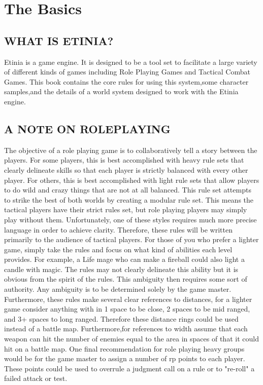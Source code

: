 \chapter{The Basics}
\section{WHAT IS ETINIA?}
Etinia is a game engine.  It is designed to be a tool set to facilitate a large
variety of different kinds of games including Role Playing Games and Tactical
Combat Games.  This book contains the core rules for using this system,some
character samples,and the details of a world system designed to work with the
Etinia engine.
\section{A NOTE ON ROLEPLAYING}
The objective of a role playing game is to collaboratively tell a story between
the players.  For some players, this is best accomplished with heavy rule sets
that clearly delineate skills so that each player is strictly balanced with
every other player.  For others, this is best accomplished with light rule sets
that allow players to do wild and crazy things that are not at all balanced.
This rule set attempts to strike the best of both worlds by creating a modular
rule set.  This means the tactical players have their strict rules set, but
role playing players may simply play without them.  Unfortunately, one of these
styles requires much more precise language in order to achieve clarity.
Therefore, these rules will be written primarily to the audience of tactical
players.  For those of you who prefer a lighter game, simply take the rules and
focus on what kind of abilities each level provides.  For example, a Life mage
who can make a fireball could also light a candle with magic.  The rules may
not clearly delineate this ability but it is obvious from the spirit of the
rules.  This ambiguity then requires some sort of authority.  Any ambiguity is
to be determined solely by the game master.  Furthermore, these rules make
several clear references to distances, for a lighter game consider anything
with in 1 space to be close, 2 spaces to be mid ranged, and 3+ spaces to long
ranged.  Therefore these distance rings could be used instead of a battle map.
Furthermore,for references to width assume that each weapon can hit the number
of enemies equal to the area in spaces of that it could hit on a battle map.
One final recommendation for role playing heavy groups would be for the game
master to assign a number of rp points to each player.  These points could be
used to overrule a judgment call on a rule or to "re-roll" a failed attack or
test.

